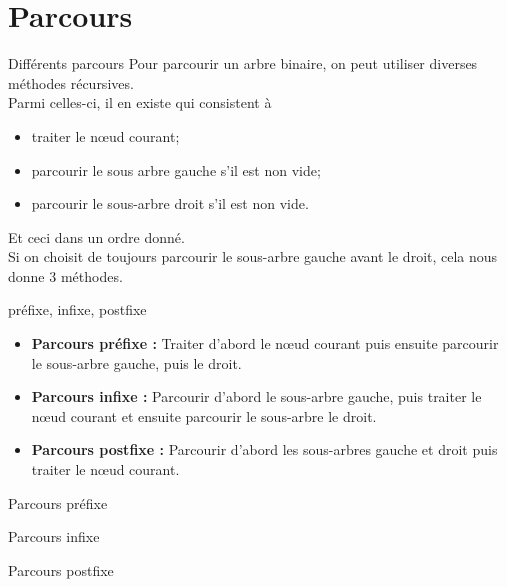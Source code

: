 \documentclass[10pt]{nsibeamer}
\begin{document}
\section{Parcours}
\begin{frame}{Différents parcours}
Pour parcourir un arbre binaire, on peut utiliser diverses méthodes récursives.\\
Parmi celles-ci, il en existe qui consistent à\\ 
\begin{itemize}
    \item traiter le n\oe ud courant;\\
    \item parcourir le sous arbre gauche s'il est non vide;\\
    \item parcourir le sous-arbre droit s'il est non vide.\\
\end{itemize}
Et ceci \alert{dans un ordre donné}.\\
Si on choisit de toujours parcourir le sous-arbre gauche avant le droit, cela nous donne 3 méthodes.
\end{frame}
\begin{frame}{préfixe, infixe, postfixe}
\begin{itemize}
    \item \textbf{Parcours préfixe :} Traiter d'abord le n\oe ud courant puis ensuite parcourir le sous-arbre gauche, puis le droit.\pause
    \item \textbf{Parcours infixe :} Parcourir d'abord le  sous-arbre gauche, puis traiter le n\oe ud courant et ensuite parcourir le sous-arbre le droit.\pause
    \item  \textbf{Parcours postfixe :} Parcourir d'abord les sous-arbres gauche et droit puis traiter le n\oe ud courant.
\end{itemize}
\end{frame}

\begin{frame}{Parcours préfixe}
    \begin{center}
    \end{center}
\end{frame}
\begin{frame}{Parcours infixe}
    \begin{center}
    \end{center}
\end{frame}
\begin{frame}{Parcours postfixe}
    \begin{center}
    \end{center}
\end{frame}
\end{document}
